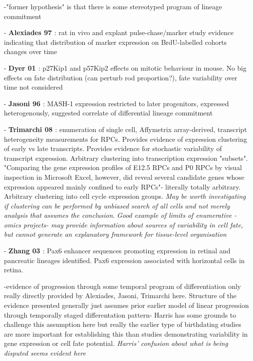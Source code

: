 -"former hypothesis" is that there is some stereotyped program of lineage commitment

- \textbf{Alexiades 97 \cite{Alexiades1997}}: rat in vivo and explant pulse-chase/marker study evidence indicating that distribution of marker expression on BrdU-labelled cohorts changes over time

- \textbf{Dyer 01 \cite{Dyer2001}}: p27Kip1 and p57Kip2 effects on mitotic behaviour in mouse. No big effects on fate distribution (can perturb rod proportion?), fate variability over time not considered

- \textbf{Jasoni 96 \cite{Jasoni1996}}: MASH-1 expression restricted to later progenitors, expressed heterogenously, suggested correlate of differential lineage commitment

- \textbf{Trimarchi 08 \cite{Trimarchi2008}}: enumeration of single cell, Affymetrix array-derived, transcript heterogeneity measurements for RPCs. Provides evidence of expression clustering of early vs late transcripts. Provides evidence for stochastic variability of transcript expression. Arbitrary clustering into transcription expression "subsets". "Comparing the gene expression profiles of E12.5
RPCs and P0 RPCs by visual inspection in Microsoft Excel, however, did reveal several candidate genes whose expression appeared mainly confined to early RPCs"- literally totally arbitrary. Arbitrary clustering into cell cycle expression groups. \textit{May be worth investigating if clustering can be performed by unbiased search of all cells and not merely analysis that assumes the conclusion}.  \textit{Good example of limits of enumerative -omics projects- may provide information about sources of variability in cell fate, but cannot generate an explanatory framework for tissue-level organisation}

- \textbf{Zhang 03 \cite{Zhang2003}}: Pax6 enhancer sequences promoting expression in retinal and pancreatic lineages identified. Pax6 expression associated with horizontal cells in retina.

-evidence of progression through some temporal program of differentiation only really directly provided by Alexiades, Jasoni, Trimarchi here. Structure of the evidence presented generally just assumes prior earlier model of linear progression through temporally staged differentation pattern- Harris has some grounds to challenge this assumption here but really the earlier type of birthdating studies are more important for establishing this than studies demonstrating variability in gene expression or cell fate potential. \textit{Harris' confusion about what is being disputed seems evident here}

